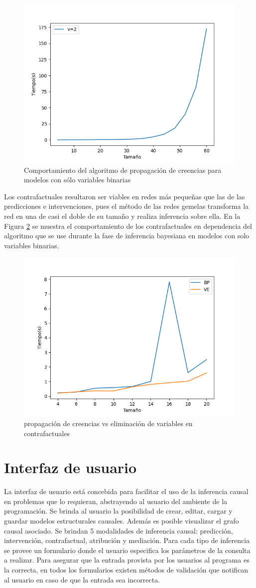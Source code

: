 \begin{figure}[h!]
	\centering
	\includegraphics[width=0.5\linewidth]{./images/Chapter-3/p-bp-8-60}
	\caption{Comportamiento del algoritmo de propagación de creencias para modelos con sólo variables binarias}
	\label{fig:p-bp-8-60}
\end{figure}

Los contrafactuales resultaron ser viables en redes más pequeñas que las de las predicciones e intervenciones, pues el método de las redes gemelas transforma la red en una de casi el doble de su tamaño y realiza inferencia sobre ella. En la Figura \ref{fig:c-8-20} se muestra el comportamiento de los contrafactuales en dependencia del algoritmo que se use durante la fase de inferencia bayesiana en modelos con solo variables binarias.

\begin{figure}[h!]
	\centering
	\includegraphics[width=0.5\linewidth]{./images/Chapter-3/c-8-20}
	\caption{propagación de creencias vs eliminación de variables en contrafactuales}
	\label{fig:c-8-20}
\end{figure}




\section{Interfaz de usuario}
La interfaz de usuario está concebida para facilitar el uso de la inferencia causal en problemas que lo requieran, abstrayendo al usuario del ambiente de la programación. Se brinda al usuario la posibilidad de crear, editar, cargar y guardar modelos estructurales causales. Además es posible visualizar el grafo causal asociado. Se brindan 5 modalidades de inferencia causal: predicción, intervención, contrafactual, atribución y mediación. Para cada tipo de inferencia se provee un formulario donde el usuario especifica los parámetros de la consulta a realizar. Para asegurar que la entrada provista por los usuarios al programa es la correcta, en todos los formularios existen métodos de validación que notifican al usuario en caso de que la entrada sea incorrecta.

